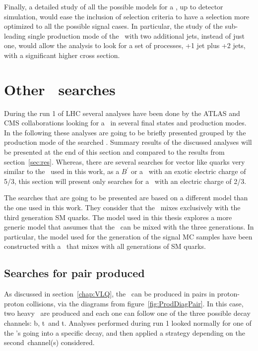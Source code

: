 Finally, a detailed study of all the possible models for a \Tp, up to detector simulation, would ease the inclusion of selection criteria to have a selection more optimized to all the possible signal cases. In particular, the study of the sub-leading single production mode of the \Tp~with two additional jets, instead of just one, would allow the analysis to look for a set of processes, \Tp+1 jet plus \Tp+2 jets, with a significant higher cross section. 

\section{Other \Tp~searches}
\label{sec:art}

During the run 1 of LHC several analyses have been done by the ATLAS and CMS collaborations looking for a \Tp~in several final states and production modes. In the following these analyses are going to be briefly presented grouped by the production mode of the searched \Tp. Summary results of the discussed analyses will be presented at the end of this section and compared to the results from section~\ref{sec:res}. Whereas, there are several searches for vector like quarks very similar to the \Tp~used in this work, as a $B^{'}$ or a \Tp~with an exotic electric charge of 5/3, this section will present only searches for a \Tp~with an electric charge of 2/3. 

The searches that are going to be presented are based on a different model than the one used in this work. They consider that the \Tp~mixes exclusively with the third generation SM quarks. The model used in this thesis explores a more generic model that assumes that the \Tp~can be mixed with the three generations. In particular, the model used for the generation of the signal MC samples have been constructed with a \Tp~that mixes with all generations of SM quarks.

\subsection{Searches for pair produced \Tp}
\label{sec:pairanal}

As discussed in section~\ref{chap:VLQ}, the \Tp~can be produced in pairs in proton-proton collisions, via the diagrams from figure~\ref{fig:ProdDiagPair}. In this case, two heavy \Tp~are produced and each one can follow one of the three possible decay channels: b\W, t\Z~and t\Hb. Analyses performed during run 1 looked normally for one of the \Tp's going into a specific decay, and then applied a strategy depending on the second\Tp~channel(s) considered. 

